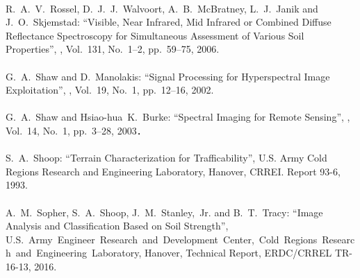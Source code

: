 \begin{mythebibliography}{}
\leavevmode \\R.~A.~V.~Rossel, D.~J.~J.~Walvoort, A.~B.~McBratney, L.~J.~Janik and J.~O.~Skjemstad:
\newblock ``Visible, Near Infrared, Mid Infrared or Combined Diffuse Reflectance Spectroscopy for Simultaneous Assessment of Various Soil Properties'',
, Vol.~131, No.~1--2, pp.~59--75, 2006.
\\

\leavevmode \\G.~A.~Shaw and D.~Manolakis:
\newblock ``Signal Processing for Hyperspectral Image Exploitation'',
, Vol.~19, No.~1, pp.~12--16, 2002.
\\

\leavevmode \\G.~A.~Shaw and Hsiao-hua~K.~Burke:
\newblock ``Spectral Imaging for Remote Sensing'',
, Vol.~14, No.~1, pp.~3--28, 2003．
\\

\leavevmode \\S.~A.~Shoop:
\newblock ``Terrain Characterization for Trafficability'',
\newblock U.S. Army Cold Regions Research and Engineering Laboratory, Hanover, CRREI. Report 93-6, 1993.
\\

\leavevmode \\A.~M.~Sopher, S.~A.~Shoop, J.~M.~Stanley,~Jr. and B.~T.~Tracy:
\newblock ``Image Analysis and Classification Based on Soil Strength'',
\newblock U.S.~Army~Engineer~Research~and~Development~Center,~Cold~Regions~Research~and~Engineering~Laboratory, Hanover, Technical Report, ERDC/CRREL TR-16-13, 2016.
\\


\end{mythebibliography}
